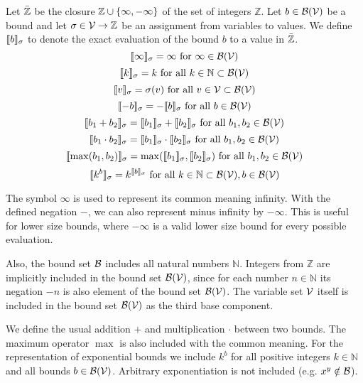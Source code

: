 \begin{definition}
  Let $\bar{\mathbb{Z}}$ be the closure $\mathbb{Z} \cup \lbrace \infty, -\infty \rbrace$ of the set of integers $\mathbb{Z}$.
  Let $b \in \mathcal{B}(\mathcal{V})$ be a bound and let $\sigma \in \mathcal{V} \rightarrow \mathbb{Z}$ be an assignment from variables to values.
  We define $\llbracket b \rrbracket_{\sigma}$ to denote the exact evaluation of the bound $b$ to a value in $\bar{\mathbb{Z}}$.
  \[ \llbracket \infty \rrbracket_{\sigma} = \infty \text{ for } \infty \in \mathcal{B}(\mathcal{V}) \]
  \[ \llbracket k \rrbracket_{\sigma} = k \text{ for all } k \in \mathbb{N} \subset \mathcal{B}(\mathcal{V}) \] 
  \[ \llbracket v \rrbracket_{\sigma} = \sigma(v) \text{ for all } v \in \mathcal{V} \subset \mathcal{B}(\mathcal{V}) \] 
  \[ \llbracket -b \rrbracket_{\sigma} = -\llbracket b \rrbracket_{\sigma} \text{ for all } b \in \mathcal{B}(\mathcal{V}) \] 
  \[ \llbracket b_1 + b_2 \rrbracket_{\sigma} = \llbracket b_1 \rrbracket_{\sigma} + \llbracket b_2 \rrbracket_{\sigma} \text{ for all } b_1, b_2 \in \mathcal{B}(\mathcal{V}) \] 
  \[ \llbracket b_1 \cdot b_2 \rrbracket_{\sigma} = \llbracket b_1 \rrbracket_{\sigma} \cdot \llbracket b_2 \rrbracket_{\sigma} \text{ for all } b_1, b_2 \in \mathcal{B}(\mathcal{V}) \] 
  \[ \llbracket \max(b_1, b_2) \rrbracket_{\sigma} = \max(\llbracket b_1 \rrbracket_{\sigma}, \llbracket b_2 \rrbracket_{\sigma}) \text{ for all } b_1, b_2 \in \mathcal{B}(\mathcal{V}) \]
  \[ \llbracket k^b \rrbracket_{\sigma} = k^{\llbracket b \rrbracket_{\sigma}} \text{ for all } k \in \mathbb{N} \subset \mathcal{B}(\mathcal{V}), b \in \mathcal{B}(\mathcal{V}) \]  
\end{definition}
The symbol $\infty$ is used to represent its common meaning infinity.
With the defined negation $-$, we can also represent minus infinity by $-\infty$.
This is useful for lower size bounds, where $-\infty$ is a valid lower size bound for every possible evaluation.

Also, the bound set $\mathcal{B}$ includes all natural numbers $\mathbb{N}$.
Integers from $\mathbb{Z}$ are implicitly included in the bound set $\mathcal{B}(\mathcal{V})$, since for each number $n \in \mathbb{N}$ its negation $-n$ is also element of the bound set $\mathcal{B}(\mathcal{V})$.
The variable set $\mathcal{V}$ itself is included in the bound set $\mathcal{B}(\mathcal{V})$ as the third base component.

We define the usual addition $+$ and multiplication $\cdot$ between two bounds.
The maximum operator $\max$ is also included with the common meaning.
For the representation of exponential bounds we include $k^b$ for all positive integers $k \in \mathbb{N}$ and all bounds $b \in \mathcal{B}(\mathcal{V})$.
Arbitrary exponentiation is not included (e.g. $x^y \notin \mathcal{B}$).

